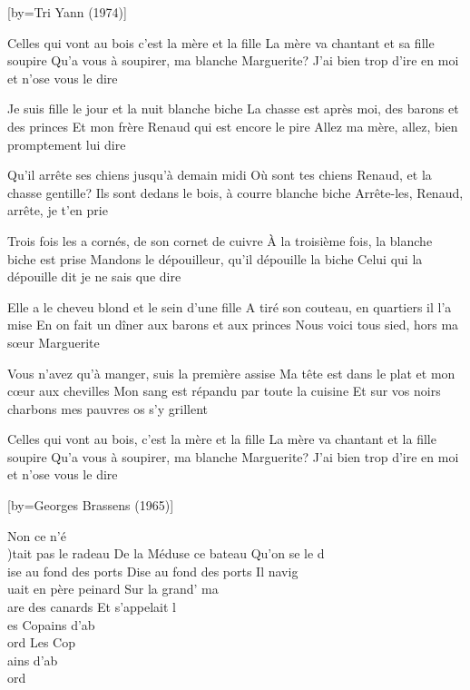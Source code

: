 [by={Tri Yann (1974)}]

\beginverse
Celles qui vont au bois c'est la mère et la fille
La mère va chantant et sa fille soupire
Qu'a vous à soupirer, ma blanche Marguerite?
J'ai bien trop d'ire en moi et n'ose vous le dire
\endverse

\beginverse
Je suis fille le jour et la nuit blanche biche
La chasse est après moi, des barons et des princes
Et mon frère Renaud qui est encore le pire
Allez ma mère, allez, bien promptement lui dire
\endverse

\beginverse
Qu'il arrête ses chiens jusqu'à demain midi
Où sont tes chiens Renaud, et la chasse gentille?
Ils sont dedans le bois, à courre blanche biche
Arrête-les, Renaud, arrête, je t'en prie
\endverse

\beginverse
Trois fois les a cornés, de son cornet de cuivre
À la troisième fois, la blanche biche est prise
Mandons le dépouilleur, qu'il dépouille la biche
Celui qui la dépouille dit je ne sais que dire
\endverse

\beginverse
Elle a le cheveu blond et le sein d'une fille
A tiré son couteau, en quartiers il l'a mise
En on fait un dîner aux barons et aux princes
Nous voici tous sied, hors ma sœur Marguerite
\endverse

\beginverse
Vous n'avez qu'à manger, suis la première assise
Ma tête est dans le plat et mon cœur aux chevilles
Mon sang est répandu par toute la cuisine
Et sur vos noirs charbons mes pauvres os s'y grillent
\endverse

\beginverse
Celles qui vont au bois, c'est la mère et la fille
La mère va chantant et la fille soupire
Qu'a vous à soupirer, ma blanche Marguerite?
J'ai bien trop d'ire en moi et n'ose vous le dire
\endverse

[by={Georges Brassens (1965)}]

\beginverse
Non ce n'é\\[Do])tait pas le radeau 
De la Méduse ce bateau
Qu'on se le d\\[Ré7]ise au fond des ports
Dise au fond des ports
Il navig\\[Fa]uait en père peinard
Sur la grand' ma\\[Mi]are des canards
Et s'appelait l\\[Lam]es Copains d'ab\\[Ré7]ord
Les Cop\\[Sol]ains d'ab\\[Do]ord\\[Sol]\\[Do]
\endverse

